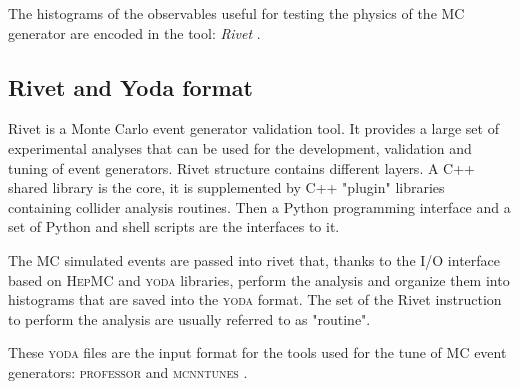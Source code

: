 The histograms of the observables useful for testing the physics of the MC generator are encoded in the tool: \textit{Rivet} \cite{RivetPaiper}.

\subsection{Rivet and Yoda format}

Rivet is a Monte Carlo event generator validation tool. It provides a large set of experimental analyses that can be used for the development, validation and tuning of event generators. Rivet structure contains different layers. A C++ shared library is the core, it is supplemented by C++ "plugin" libraries containing collider analysis routines. Then a Python programming interface  and a set of Python and shell scripts are the interfaces to it. 

The MC simulated events are passed into rivet that, thanks to the I/O interface based on \textsc{HepMC} \cite{HepMC} and \textsc{yoda} \cite{YODA} libraries, perform the analysis and organize them into histograms that are saved into the \textsc{yoda} format. The set of the Rivet instruction to perform the analysis are usually referred to as "routine".

These \textsc{yoda} files are the input format for the tools used for the tune of MC event generators: \textsc{professor} \cite{Buckley:2009bj} and \textsc{mcnntunes} \cite{MCNNTUNESarticle}.
